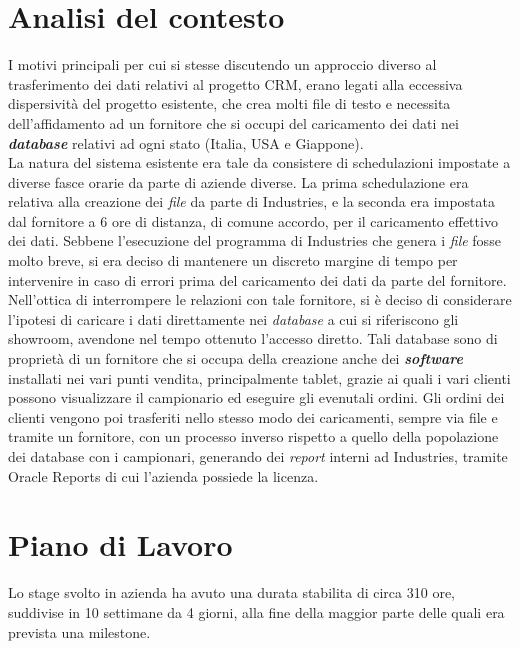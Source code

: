 
\section{Analisi del contesto}
I motivi principali per cui si stesse discutendo un approccio diverso al trasferimento dei dati relativi al progetto CRM, erano legati alla eccessiva dispersività del progetto esistente, che crea molti file di testo e necessita dell'affidamento ad un fornitore che si occupi del caricamento dei dati nei \textit{\textbf{database}} relativi ad ogni stato (Italia, USA e Giappone).\\
La natura del sistema esistente era tale da consistere di schedulazioni impostate a diverse fasce orarie da parte di aziende diverse. La prima schedulazione era relativa alla creazione dei \textit{file} da parte di Industries, e la seconda era impostata dal fornitore a 6 ore di distanza, di comune accordo, per il caricamento effettivo dei dati. Sebbene l'esecuzione del programma di Industries che genera i \textit{file} fosse molto breve, si era deciso di mantenere un discreto margine di tempo per intervenire in caso di errori prima del caricamento dei dati da parte del fornitore.\\
Nell'ottica di interrompere le relazioni con tale fornitore, si è deciso di considerare l'ipotesi di caricare i dati direttamente nei \textit{database} a cui si riferiscono gli showroom, avendone nel tempo ottenuto l'accesso diretto. Tali database sono di proprietà di un fornitore che si occupa della creazione anche dei \textit{\textbf{software}} installati nei vari punti vendita, principalmente tablet, grazie ai quali i vari clienti possono visualizzare il campionario ed eseguire gli evenutali ordini. Gli ordini dei clienti vengono poi trasferiti nello stesso modo dei caricamenti, sempre via file e tramite un fornitore, con un processo inverso rispetto a quello della popolazione dei database con i campionari, generando dei \textit{report} interni ad Industries, tramite Oracle Reports di cui l'azienda possiede la licenza.

\section{Piano di Lavoro}
Lo stage svolto in azienda ha avuto una durata stabilita di circa 310 ore, suddivise in 10 settimane da 4 giorni, alla fine della maggior parte delle quali era prevista una milestone.
\newpage
